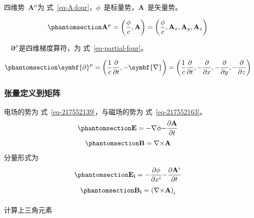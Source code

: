 \documentclass[
  chinese,
  a4paper,
  UTF8,
  12pt,
  oneside,
  openany]{ctexbook}
\makeatletter
\let\oldparagraph\paragraph
\renewcommand{\paragraph}{
    \@ifstar
      \xxxParagraphStar
      \xxxParagraphNoStar
  }
\newcommand{\xxxParagraphStar}[1]{\oldparagraph*{#1}\mbox{}}
\newcommand{\xxxParagraphNoStar}[1]{\oldparagraph{#1}\mbox{}}
\makeatother
\begin{document}
四维势~\(\mathbf{A}^{\mu}\)为
式~\ref{eq-A-four}，\(\phi\)~是标量势，\(\mathbf{A}\)~是矢量势。

\begin{equation}\protect\phantomsection\label{eq-A-four}{
\mathbf{A}^{\mu} = \left( \frac{\phi}{c},\mathbf{A} \right) = \left( \frac{\phi}{c},\mathbf{A}_{x},\mathbf{A}_{y},\mathbf{A}_{z} \right)
}\end{equation}

~~\(\symbf{\partial}^{\mu}\)是四维梯度算符，为
式~\ref{eq-partial-four}。

\begin{equation}\protect\phantomsection\label{eq-partial-four}{
\symbf{\partial}^{\mu} = \left( \frac{1}{c}\frac{\partial}{\partial t}, - \symbf{\nabla} \right) = \left( \frac{1}{c}\frac{\partial}{\partial t}, - \frac{\partial}{\partial x}, - \frac{\partial}{\partial y}, - \frac{\partial}{\partial z} \right)
}\end{equation}

\subsubsection{张量定义到矩阵}\label{ux5f20ux91cfux5b9aux4e49ux5230ux77e9ux9635}

电场的势为 式~\ref{eq-217552139}，与磁场的势为 式~\ref{eq-217552163}。
\begin{equation}\protect\phantomsection\label{eq-217552139}{\mathbf{E} = - \nabla\phi\mathbf{-}\frac{\partial\mathbf{A}}{\partial t}}\end{equation}
\begin{equation}\protect\phantomsection\label{eq-217552163}{\mathbf{B} = \nabla\mathbf{\times A}}\end{equation}
分量形式为
\begin{equation}\protect\phantomsection\label{eq-217553109}{\mathbf{E}_{\mathbf{i}} = - \frac{\partial\phi}{\partial x^{i}}\mathbf{-}\frac{\partial\mathbf{A}^{i}}{\partial t}}\end{equation}
\begin{equation}\protect\phantomsection\label{eq-21755310911}{\mathbf{B}_{\mathbf{i}} = \left( \nabla\mathbf{\times A} \right)_{i} }\end{equation}

\paragraph{计算上三角元素}\label{ux8ba1ux7b97ux4e0aux4e09ux89d2ux5143ux7d20}
\end{document}
